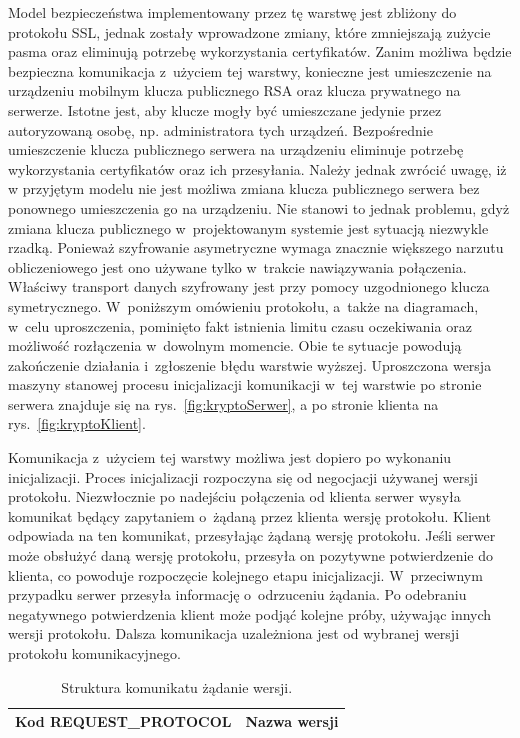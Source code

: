Model bezpieczeństwa implementowany przez tę warstwę jest zbliżony do
protokołu SSL, jednak zostały wprowadzone zmiany, które zmniejszają
zużycie pasma oraz eliminują potrzebę wykorzystania
certyfikatów. Zanim możliwa będzie bezpieczna komunikacja z~użyciem
tej warstwy, konieczne jest umieszczenie na urządzeniu mobilnym klucza
publicznego RSA oraz klucza prywatnego na serwerze. Istotne jest, aby
klucze mogły być umieszczane jedynie przez autoryzowaną osobę,
np. administratora tych urządzeń. Bezpośrednie umieszczenie klucza
publicznego serwera na urządzeniu eliminuje potrzebę wykorzystania
certyfikatów oraz ich przesyłania. Należy jednak zwrócić uwagę, iż w
przyjętym modelu nie jest możliwa zmiana klucza publicznego serwera
bez ponownego umieszczenia go na urządzeniu. Nie stanowi to jednak
problemu, gdyż zmiana klucza publicznego w~projektowanym systemie jest
sytuacją niezwykle rzadką. Ponieważ szyfrowanie asymetryczne wymaga
znacznie większego narzutu obliczeniowego jest ono używane tylko
w~trakcie nawiązywania połączenia. Właściwy transport danych
szyfrowany jest przy pomocy uzgodnionego klucza
symetrycznego. W~poniższym omówieniu protokołu, a~także na diagramach,
w~celu uproszczenia, pominięto fakt istnienia limitu czasu oczekiwania
oraz możliwość rozłączenia w~dowolnym momencie. Obie te sytuacje
powodują zakończenie działania i~zgłoszenie błędu warstwie
wyższej. Uproszczona wersja maszyny stanowej procesu inicjalizacji
komunikacji w~tej warstwie po stronie serwera znajduje się na
rys.~\ref{fig:kryptoSerwer}, a po stronie klienta na
rys.~\ref{fig:kryptoKlient}.

Komunikacja z~użyciem tej warstwy możliwa jest dopiero po wykonaniu
inicjalizacji. Proces inicjalizacji rozpoczyna się od negocjacji
używanej wersji protokołu. Niezwłocznie po nadejściu połączenia od
klienta serwer wysyła komunikat będący zapytaniem o~żądaną przez
klienta wersję protokołu. Klient odpowiada na ten komunikat,
przesyłając żądaną wersję protokołu. Jeśli serwer może obsłużyć daną
wersję protokołu, przesyła on pozytywne potwierdzenie do klienta, co
powoduje rozpoczęcie kolejnego etapu inicjalizacji. W~przeciwnym
przypadku serwer przesyła informację o~odrzuceniu żądania. Po
odebraniu negatywnego potwierdzenia klient może podjąć kolejne próby,
używając innych wersji protokołu. Dalsza komunikacja uzależniona jest
od wybranej wersji protokołu komunikacyjnego.

\begin{table}[H]
\centering
\caption{Struktura komunikatu żądanie wersji.}

\begin{tabular}{|p{5cm}|p{6cm}|}
\hline
\raggedright{Kod REQUEST\_PROTOCOL} & Nazwa wersji\\
\hline
\end{tabular}
\end{table}

